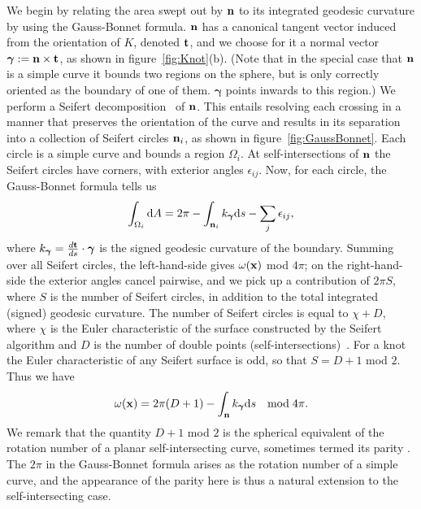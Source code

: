     We begin by relating the area swept out by ${\bf n}$ to its integrated geodesic curvature by using the Gauss-Bonnet formula. ${\bf n}$ has a canonical tangent vector induced from the orientation of $K$, denoted $\bf t$, and we choose for it a normal vector $\boldsymbol \gamma := \bf n \times \bf t$, as shown in figure~\ref{fig:Knot}(b). (Note that in the special case that ${\bf n}$ is a simple curve it bounds two regions on the sphere, but is only correctly oriented as the boundary of one of them. ${\boldsymbol \gamma}$ points inwards to this region.) We perform a Seifert decomposition~\citep{Adams2004} of ${\bf n}$. This entails resolving each crossing in a manner that preserves the orientation of the curve and results in its separation into a collection of Seifert circles ${\bf n}_i$, as shown in figure~\ref{fig:GaussBonnet}. Each circle is a simple curve and bounds a region $\Omega_i$. At self-intersections of ${\bf n}$ the Seifert circles have corners, with exterior angles $\epsilon_{ij}$. Now, for each circle, the Gauss-Bonnet formula tells us
    \begin{equation}
        \int_{\Omega_i} \mathrm{d} A  = 2 \pi - \int_{{\bf n}_i} k_{\boldsymbol \gamma} \mathrm{d} s - \sum_j \epsilon_{ij} ,
        \label{eq:GaussBonnetSeifert}
    \end{equation}
    where $k_{\boldsymbol \gamma} = \frac{d {\bf t}}{d s} \cdot {\boldsymbol \gamma}$ is the signed geodesic curvature of the boundary. Summing over all Seifert circles, the left-hand-side gives $\omega({\bf x})$ mod $4\pi$; on the right-hand-side the exterior angles cancel pairwise, and we pick up a contribution of $2\pi S$, where $S$ is the number of Seifert circles, in addition to the total integrated (signed) geodesic curvature. The number of Seifert circles is equal to $\chi + D$, where $\chi$ is the Euler characteristic of the surface constructed by the Seifert algorithm and $D$ is the number of double points (self-intersections)~\citep{Adams2004,Lickorish1997}. For a knot the Euler characteristic of any Seifert surface is odd, so that $S = D+1$ mod $2$. Thus we have
    \begin{equation}
        \omega({\bf x})  = 2 \pi (D + 1) - \int_{{\bf n}} k_{\boldsymbol \gamma} \mathrm{d}s\quad\textrm{mod}\; 4\pi .
        \label{eq:GaussBonnetImmersed}
    \end{equation} 
    We remark that the quantity $D+1$ mod $2$ is the spherical equivalent of the rotation number of a planar self-intersecting curve, sometimes termed its parity \citep{Whitney1937,Phillips1966,Solomon1996}. The $2 \pi$ in the Gauss-Bonnet formula arises as the rotation number of a simple curve, and the appearance of the parity here is thus a natural extension to the self-intersecting case. 

